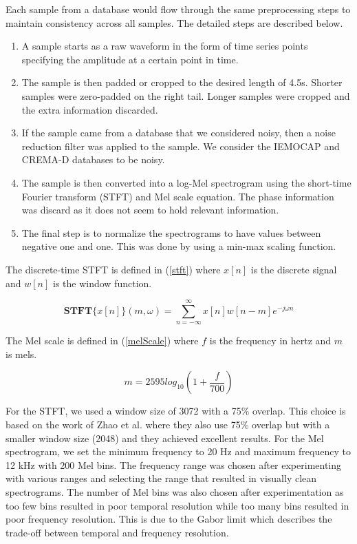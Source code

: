 \documentclass[conference]{IEEEtran}
\begin{document}
Each sample from a database would flow through the same preprocessing steps to maintain consistency across all samples. The detailed steps are described below.
\begin{enumerate}
	\item A sample starts as a raw waveform in the form of time series points specifying the amplitude at a certain point in time.
	\item The sample is then padded or cropped to the desired length of 4.5s. Shorter samples were zero-padded on the right tail. Longer samples were cropped and the extra information discarded.
	\item If the sample came from a database that we considered noisy, then a noise reduction filter was applied to the sample. We consider the IEMOCAP and CREMA-D databases to be noisy.
	\item The sample is then converted into a log-Mel spectrogram using the short-time Fourier transform (STFT) and Mel scale equation. The phase information was discard as it does not seem to hold relevant information. \cite{Kozakowski2017}
	\item The final step is to normalize the spectrograms to have values between negative one and one. This was done by using a min-max scaling function.
\end{enumerate}

The discrete-time STFT is defined in (\ref{stft}) where $x[n]$ is the discrete signal and $w[n]$ is the window function.

\begin{equation}
	\label{stft}
	\mathbf{STFT}\{x[n]\}(m,\omega) = \sum_{n=-\infty}^{\infty}x[n]w[n-m]e^{-j \omega n}
\end{equation}

The Mel scale is defined in (\ref{melScale}) where $f$ is the frequency in hertz and $m$ is mels.\cite{Oshaughnessy1990}

\begin{equation}
\label{melScale}
m = 2595 log_{10}(1 + \frac{f}{700})
\end{equation}

For the STFT, we used a window size of 3072 with a 75\% overlap. This choice is based on the work of Zhao et al. \cite{Zhao2019} where they also use 75\% overlap but with a smaller window size (2048) and they achieved excellent results. For the Mel spectrogram, we set the minimum frequency to 20 Hz and maximum frequency to 12 kHz with 200 Mel bins. The frequency range was chosen after experimenting with various ranges and selecting the range that resulted in visually clean spectrograms. The number of Mel bins was also chosen after experimentation as too few bins resulted in poor temporal resolution while too many bins resulted in poor frequency resolution. This is due to the Gabor limit which describes the trade-off between temporal and frequency resolution.
\end{document}
